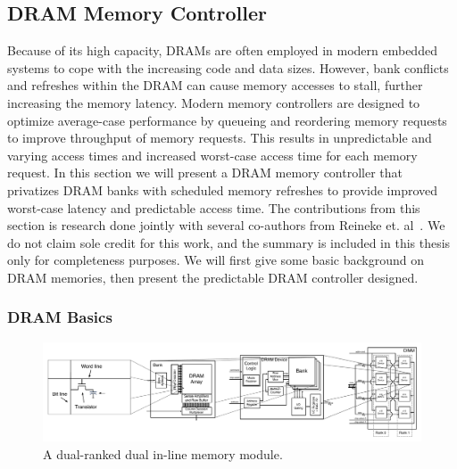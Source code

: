 \subsection{DRAM Memory Controller}
Because of its high capacity, DRAMs are often employed in modern embedded systems to cope with the increasing code and data sizes.  
However, bank conflicts and refreshes within the DRAM can cause memory accesses to stall, further increasing the memory latency. 
Modern memory controllers are designed to optimize average-case performance by queueing and reordering memory requests to improve throughput of memory requests. 
This results in unpredictable and varying access times and increased worst-case access time for each memory request.
In this section we will present a DRAM memory controller that privatizes DRAM banks with scheduled memory refreshes to provide improved worst-case latency and predictable access time.    
The contributions from this section is research done jointly with several co-authors from Reineke et. al~\cite{ReinekeLiuPatelKimLee11_PRETDRAMControllerBankPrivatizationForPredictability}. 
We do not claim sole credit for this work, and the summary is included in this thesis only for completeness purposes. 
We will first give some basic background on DRAM memories, then present the predictable DRAM controller designed.

\subsubsection{DRAM Basics}

\begin{figure}
\begin{center}
\includegraphics[width=\textwidth]{figs/dram-overview.pdf}
\vspace{-13mm}
\caption{A dual-ranked dual in-line memory module.}\label{fig:dram_basics}
\vspace{-6mm}
\end{center}
\end{figure} 

